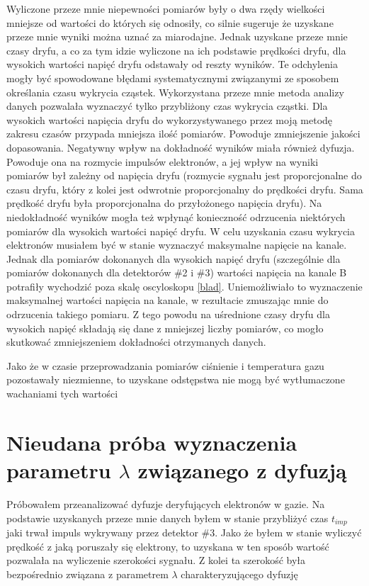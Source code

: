 \documentclass[10pt,a4paper]{article}
\begin{document}
\begin{figure}
\end{figure} Wyliczone przeze mnie niepewności pomiarów były o dwa rzędy wielkości mniejsze od wartości do których się odnosiły, co silnie sugeruje że uzyskane przeze mnie wyniki można uznać za miarodajne. Jednak uzyskane przeze mnie czasy dryfu, a co za tym idzie wyliczone na ich podstawie prędkości dryfu, dla wysokich wartości napięć dryfu odstawały od reszty wyników. Te odchylenia mogły być spowodowane błędami systematycznymi związanymi ze sposobem określania czasu wykrycia cząstek. Wykorzystana przeze mnie metoda analizy danych pozwalała wyznaczyć tylko przybliżony czas wykrycia cząstki. Dla wysokich wartości napięcia dryfu do wykorzystywanego przez moją metodę zakresu czasów przypada mniejsza ilość pomiarów. Powoduje zmniejszenie jakości dopasowania. Negatywny wpływ na dokładność wyników miała również dyfuzja. Powoduje ona na rozmycie impulsów elektronów, a jej wpływ na wyniki pomiarów był zależny od napięcia dryfu (rozmycie sygnału jest proporcjonalne do czasu dryfu, który z kolei jest odwrotnie proporcjonalny do prędkości dryfu. Sama prędkość dryfu była proporcjonalna do przyłożonego napięcia dryfu). Na niedokładność wyników mogła też wpłynąć konieczność odrzucenia niektórych pomiarów dla wysokich wartości napięć dryfu. W celu uzyskania czasu wykrycia elektronów musiałem być w stanie wyznaczyć maksymalne napięcie na kanale. Jednak dla pomiarów dokonanych dla wysokich napięć dryfu (szczególnie dla pomiarów dokonanych dla detektorów \#2 i \#3) wartości napięcia na kanale B potrafiły wychodzić poza skalę oscyloskopu \ref{blad}. Uniemożliwiało to wyznaczenie maksymalnej wartości napięcia na kanale, w rezultacie zmuszając mnie do odrzucenia takiego pomiaru. Z tego powodu na uśrednione czasy dryfu dla wysokich napięć składają się dane z mniejszej liczby pomiarów, co mogło skutkować zmniejszeniem dokładności otrzymanych danych.

Jako że w czasie przeprowadzania pomiarów ciśnienie i temperatura gazu pozostawały niezmienne, to uzyskane odstępstwa nie mogą być wytłumaczone wachaniami tych wartości

\newpage

\section{Nieudana próba wyznaczenia parametru $\lambda$ związanego z dyfuzją}

Próbowałem przeanalizować dyfuzje deryfujących elektronów w gazie. Na podstawie uzyskanych przeze mnie danych byłem w stanie przybliżyć czas $t_{imp}$ jaki trwał impuls wykrywany przez detektor \#3. Jako że byłem w stanie wyliczyć prędkość z jaką poruszały się elektrony, to uzyskana w ten sposób wartość pozwalała na wyliczenie szerokości sygnału. Z kolei ta szerokość była bezpośrednio związana z parametrem $\lambda$ charakteryzującego dyfuzję
\end{document}
